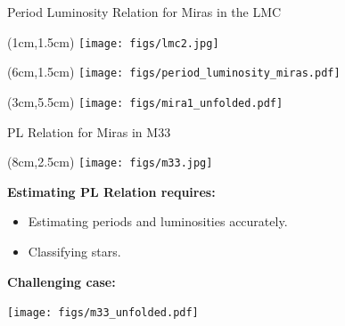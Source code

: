 \documentclass[12pt]{beamer}
\begin{document}
\begin{frame}{Period Luminosity Relation for Miras in the LMC}



\begin{textblock*}{3cm}(1cm,1.5cm) %
\texttt{[image: figs/lmc2.jpg]}
\end{textblock*}




\begin{textblock*}{3cm}(6cm,1.5cm) %
\texttt{[image: figs/period\_luminosity\_miras.pdf]}
\end{textblock*}



\begin{textblock*}{3cm}(3cm,5.5cm) %
\texttt{[image: figs/mira1\_unfolded.pdf]}\\
\end{textblock*}


\end{frame}


\begin{frame}{PL Relation for Miras in M33}

\begin{textblock*}{3cm}(8cm,2.5cm) %
\texttt{[image: figs/m33.jpg]}
\end{textblock*}




\textbf{Estimating PL Relation requires:}



\begin{itemize}
\item Estimating periods and luminosities accurately.
\item Classifying stars.
\end{itemize}


\vspace{.3in}

\textbf{Challenging case:}
\begin{center}
\texttt{[image: figs/m33\_unfolded.pdf]}
\end{center}

\end{frame}
\end{document}
